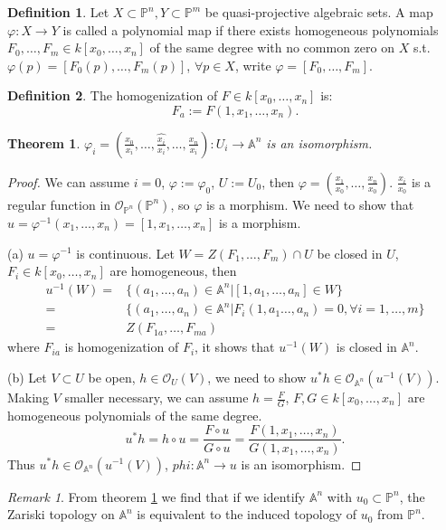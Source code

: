 \documentclass{amsart}
\theoremstyle{plain}
\newtheorem{theorem}{Theorem}
\theoremstyle{definition}
\newtheorem{definition}{Definition}
\theoremstyle{remark}
\newtheorem*{remark}{Remark}
\numberwithin{equation}{section}
\begin{document}
\begin{definition}
	Let $ X\subset \mathbb{P}^n,Y\subset \mathbb{P}^m $ be quasi-projective algebraic sets. A map $ \varphi:X\to Y $ is called a polynomial map if there exists homogeneous polynomials $ F_0,\dots,F_m\in k[x_0,\dots,x_n] $ of the same degree with no common zero on $ X $ s.t.
	$ \varphi(p)=[F_0(p),\dots,F_m(p)] $, $ \forall p\in X $, write $ \varphi=[F_0,\dots,F_m] $.
\end{definition}
\begin{definition}
	The homogenization of $ F\in k[x_0,\dots,x_n] $ is:
	$$
	F_a:=F(1,x_1,\dots,x_n).
	$$
\end{definition}
\begin{theorem}\label{13}
	$ \varphi_i=(\frac{x_0}{x_i},\dots,\hat{\frac{x_i}{x_i}},\dots,\frac{x_n}{x_i}):U_i\to \mathbb{A}^n $ is an isomorphism.
\end{theorem}
\begin{proof}
	We can assume $ i=0 $, $ \varphi:=\varphi_0 $, $ U:=U_0 $, then $ \varphi=(\frac{x_1}{x_0},\dots,\frac{x_n}{x_0}) $. $ \frac{x_i}{x_0} $ is a regular function in $ \mathcal{O}_{\mathbb{P}^n}(\mathbb{P}^n) $, so $ \varphi $ is a morphism. We need to show that $ u=\varphi^{-1}(x_1,\dots,x_n)=[1,x_1,\dots,x_n] $ is a morphism.
	
	(a) $ u=\varphi^{-1} $ is continuous. Let $ W=Z(F_1,\dots,F_m)\cap U $ be closed in $ U $, $ F_i\in k[x_0,\dots,x_n] $ are homogeneous, then
	$$\begin{array}{cc}
	u^{-1}(W)= & \{ (a_1,\dots,a_n)\in \mathbb{A}^n|[1,a_1,\dots,a_n]\in W \}\\
	= & \{ (a_1,\dots,a_n)\in \mathbb{A}^n|F_i(1,a_1\dots,a_n)=0, \forall i=1,\dots,m \} \\
	= & Z(F_{1a},\dots,F_{ma})
	\end{array}$$
	where $ F_{ia} $ is homogenization of $ F_i $, it shows that $ u^{-1}(W) $ is closed in $ \mathbb{A}^n  $.
	
	(b) Let $ V\subset U $ be open, $ h\in \mathcal{O}_U(V) $, we need to show $ u^\ast h\in \mathcal{O}_{\mathbb{A}^n}(u^{-1}(V)) $. Making $ V $ smaller necessary, we can assume $ h=\frac{F}{G} $, $ F,G \in k[x_0,\dots,x_n]$ are homogeneous polynomials of the same degree.
	$$
	u^\ast h = h\circ u=\frac{F\circ u}{G\circ u}=\frac{F(1,x_1,\dots,x_n)}{G(1,x_1,\dots,x_n)}.
	$$
	Thus $ u^\ast h\in \mathcal{O}_{\mathbb{A}^n}(u^{-1}(V)) $, $ phi:\mathbb{A}^n\to u $ is an isomorphism.
\end{proof}
\begin{remark}
	From theorem \ref{13} we find that if we identify $ \mathbb{A}^n $ with $ u_0\subset \mathbb{P}^n $, the Zariski topology on $ \mathbb{A}^n $ is equivalent to the induced topology of $ u_0 $ from $ \mathbb{P}^n $.
\end{remark}

 
\end{document}
